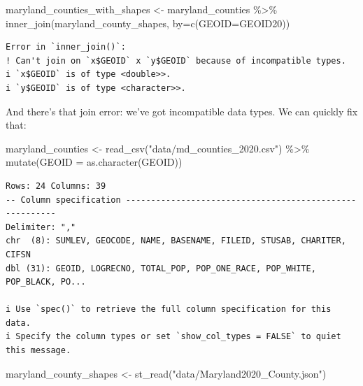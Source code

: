\documentclass[
  letterpaper,
  DIV=11,
  numbers=noendperiod]{scrreprt}
\newenvironment{Shaded}{\begin{snugshade}}{\end{snugshade}}
\newcommand{\AttributeTok}[1]{\textcolor[rgb]{0.40,0.45,0.13}{#1}}
\newcommand{\FunctionTok}[1]{\textcolor[rgb]{0.28,0.35,0.67}{#1}}
\newcommand{\NormalTok}[1]{\textcolor[rgb]{0.00,0.23,0.31}{#1}}
\newcommand{\OtherTok}[1]{\textcolor[rgb]{0.00,0.23,0.31}{#1}}
\newcommand{\SpecialCharTok}[1]{\textcolor[rgb]{0.37,0.37,0.37}{#1}}
\newcommand{\StringTok}[1]{\textcolor[rgb]{0.13,0.47,0.30}{#1}}
\begin{document}
\begin{Shaded}
\begin{Highlighting}[]
\NormalTok{maryland\_counties\_with\_shapes }\OtherTok{\textless{}{-}}\NormalTok{ maryland\_counties }\SpecialCharTok{\%\textgreater{}\%} \FunctionTok{inner\_join}\NormalTok{(maryland\_county\_shapes, }\AttributeTok{by=}\FunctionTok{c}\NormalTok{(}\StringTok{\textquotesingle{}GEOID\textquotesingle{}}\OtherTok{=}\StringTok{\textquotesingle{}GEOID20\textquotesingle{}}\NormalTok{))}
\end{Highlighting}
\end{Shaded}

\begin{verbatim}
Error in `inner_join()`:
! Can't join on `x$GEOID` x `y$GEOID` because of incompatible types.
i `x$GEOID` is of type <double>>.
i `y$GEOID` is of type <character>>.
\end{verbatim}

And there's that join error: we've got incompatible data types. We can
quickly fix that:

\begin{Shaded}
\begin{Highlighting}[]
\NormalTok{maryland\_counties }\OtherTok{\textless{}{-}} \FunctionTok{read\_csv}\NormalTok{(}\StringTok{"data/md\_counties\_2020.csv"}\NormalTok{) }\SpecialCharTok{\%\textgreater{}\%} \FunctionTok{mutate}\NormalTok{(}\AttributeTok{GEOID =} \FunctionTok{as.character}\NormalTok{(GEOID))}
\end{Highlighting}
\end{Shaded}

\begin{verbatim}
Rows: 24 Columns: 39
-- Column specification --------------------------------------------------------
Delimiter: ","
chr  (8): SUMLEV, GEOCODE, NAME, BASENAME, FILEID, STUSAB, CHARITER, CIFSN
dbl (31): GEOID, LOGRECNO, TOTAL_POP, POP_ONE_RACE, POP_WHITE, POP_BLACK, PO...

i Use `spec()` to retrieve the full column specification for this data.
i Specify the column types or set `show_col_types = FALSE` to quiet this message.
\end{verbatim}

\begin{Shaded}
\begin{Highlighting}[]
\NormalTok{maryland\_county\_shapes }\OtherTok{\textless{}{-}} \FunctionTok{st\_read}\NormalTok{(}\StringTok{"data/Maryland2020\_County.json"}\NormalTok{)}
\end{Highlighting}
\end{Shaded}
\end{document}
